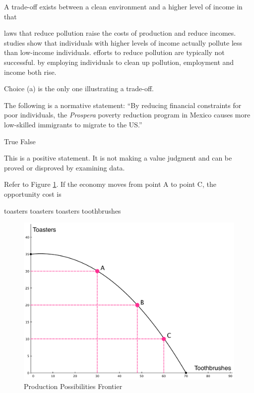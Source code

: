 \documentclass[addpoints,11pt]{exam}
\theoremstyle{definition}
\begin{document}
\begin{questions}
	
	\question A trade-off exists between a clean environment and a higher level of income in that 
		\begin{choices}
			\CorrectChoice laws that reduce pollution raise the costs of production and reduce incomes.
			\choice studies show that individuals with higher levels of income actually pollute less than low-income individuals.
			\choice efforts to reduce pollution are typically not successful.
			\choice by employing individuals to clean up pollution, employment and income both rise.
		\end{choices}
		
		\begin{solution}
			Choice (a) is the only one illustrating a trade-off.
		\end{solution}
	
	\question The following is a normative statement: ``By reducing financial constraints for poor individuals, the \textit{Prospera} poverty reduction program in Mexico causes more low-skilled immigrants to migrate to the US.''
	
		\begin{choices}
			\choice True
			\CorrectChoice False
		\end{choices} 
		
		\begin{solution}
			This is a positive statement. It is not making a value judgment and can be proved or disproved by examining data.
		\end{solution}
			
	\question Refer to Figure \ref{fig1}. If the economy moves from point A to point C, the opportunity cost is
		\begin{choices}
			 toasters
			 toasters
			 toasters
			 toothbrushes
		\end{choices}
		
	\begin{figure}[H]
		\centering
		\includegraphics[scale=.3]{hw1_plot1.pdf}
		\caption{Production Possibilities Frontier}
		\label{fig1}
	\end{figure}
	

\end{questions}
\end{document}
